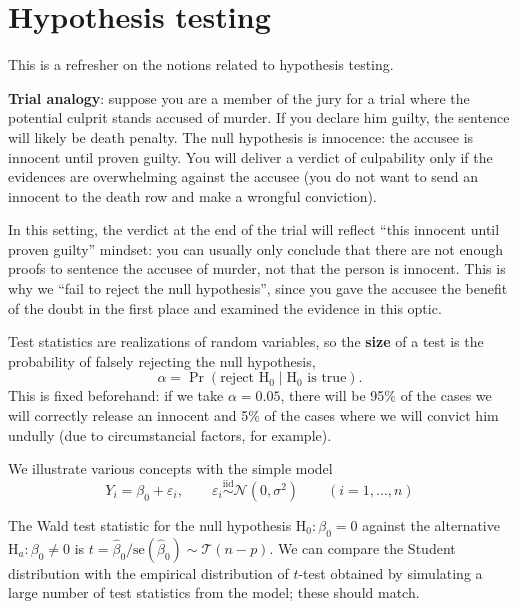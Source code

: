 \documentclass[]{book}
\theoremstyle{definition}
\theoremstyle{definition}
\theoremstyle{definition}
\theoremstyle{remark}
\begin{document}
\hypertarget{hypothesis-testing}{%
\chapter{Hypothesis testing}\label{hypothesis-testing}}

This is a refresher on the notions related to hypothesis testing.

\textbf{Trial analogy}: suppose you are a member of the jury for a trial
where the potential culprit stands accused of murder. If you declare him
guilty, the sentence will likely be death penalty. The null hypothesis
is innocence: the accusee is innocent until proven guilty. You will
deliver a verdict of culpability only if the evidences are overwhelming
against the accusee (you do not want to send an innocent to the death
row and make a wrongful conviction).

In this setting, the verdict at the end of the trial will reflect ``this
innocent until proven guilty'' mindset: you can usually only conclude
that there are not enough proofs to sentence the accusee of murder, not
that the person is innocent. This is why we ``fail to reject the null
hypothesis'', since you gave the accusee the benefit of the doubt in the
first place and examined the evidence in this optic.

Test statistics are realizations of random variables, so the
\textbf{size} of a test is the probability of falsely rejecting the null
hypothesis,
\[\alpha = \Pr(\text{reject }\mathrm{H}_0 \mid \mathrm{H}_0 \text{ is true}).\]This
is fixed beforehand: if we take \(\alpha = 0.05\), there will be 95\% of
the cases we will correctly release an innocent and 5\% of the cases
where we will convict him undully (due to circumstancial factors, for
example).

We illustrate various concepts with the simple model
\[Y_i = \beta_0 + \varepsilon_i, \qquad\varepsilon_i \stackrel{\mathrm{iid}}{\sim} \mathcal{N}(0, \sigma^2) \qquad (i=1, \ldots, n)\]

The Wald test statistic for the null hypothesis
\(\mathrm{H}_0: \beta_0=0\) against the alternative
\(\mathrm{H}_a: \beta_0 \neq 0\) is
\(t = \hat{\beta}_0/\mathrm{se}(\hat{\beta}_0) \sim \mathcal{T}(n-p)\).
We can compare the Student distribution with the empirical distribution
of \(t\)-test obtained by simulating a large number of test statistics
from the model; these should match.
\end{document}
